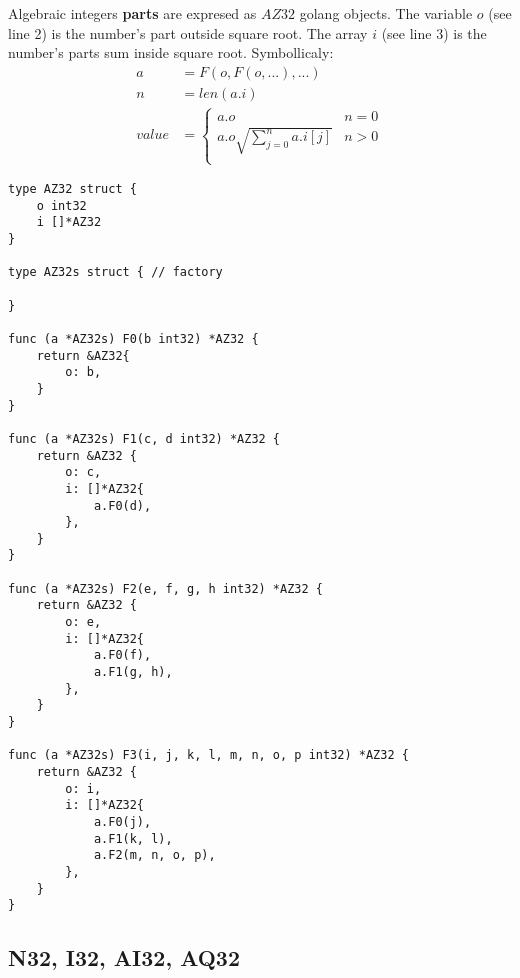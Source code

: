 \documentclass{article}
\begin{document}
Algebraic integers \textbf{parts} are expresed as $AZ32$ golang objects.
The variable $o$ (see line 2) is the number's part outside square root.
The array $i$ (see line 3) is the number's parts sum inside square root.
Symbollicaly:
\begin{align}
a &= F(o,F(o,...),...)\\
n &= len(a.i)\\
value &= \begin{cases}
 a.o                               &n = 0\\
 a.o\sqrt{ \sum_{j=0}^{n} a.i[j] } &n > 0\\
\end{cases}
\end{align}

\begin{lstlisting}
type AZ32 struct {
	o int32
	i []*AZ32
}

type AZ32s struct { // factory
	
}

func (a *AZ32s) F0(b int32) *AZ32 {
	return &AZ32{
		o: b,
	}
}

func (a *AZ32s) F1(c, d int32) *AZ32 {
	return &AZ32 {
		o: c,
		i: []*AZ32{
			a.F0(d),
		},
	}
}

func (a *AZ32s) F2(e, f, g, h int32) *AZ32 {
	return &AZ32 {
		o: e,
		i: []*AZ32{
			a.F0(f),
			a.F1(g, h),
		},
	}
}

func (a *AZ32s) F3(i, j, k, l, m, n, o, p int32) *AZ32 {
	return &AZ32 {
		o: i,
		i: []*AZ32{
			a.F0(j),
			a.F1(k, l),
			a.F2(m, n, o, p),
		},
	}
}
\end{lstlisting}



\subsection{N32, I32, AI32, AQ32}
\end{document}
